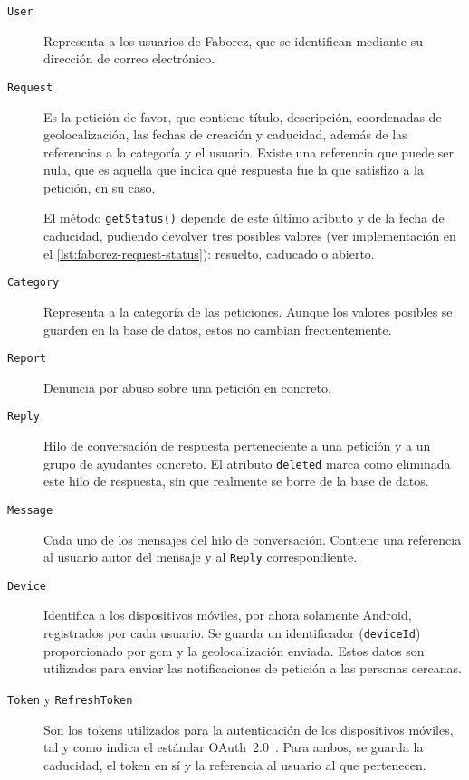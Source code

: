 \documentclass[main]{subfiles}
\begin{document}
\begin{description}
  \item[\texttt{User}] Representa a los usuarios de Faborez, que se identifican mediante su dirección de correo electrónico.
  \item[\texttt{Request}] Es la petición de favor, que contiene título, descripción, coordenadas de geolocalización, las fechas de creación y caducidad, además de las referencias a la categoría y el usuario. Existe una referencia que puede ser nula, que es aquella que indica qué respuesta fue la que satisfizo a la petición, en su caso.
  
  El método \texttt{getStatus()} depende de este último aributo y de la fecha de caducidad, pudiendo devolver tres posibles valores (ver implementación en el \cref{lst:faborez-request-status}): resuelto, caducado o abierto.
  
  \item[\texttt{Category}] Representa a la categoría de las peticiones. Aunque los valores posibles se guarden en la base de datos, estos no cambian frecuentemente.
  
  \item[\texttt{Report}] Denuncia por abuso sobre una petición en concreto.
  
  \item[\texttt{Reply}] Hilo de conversación de respuesta perteneciente a una petición y a un grupo de ayudantes concreto. El atributo \texttt{deleted} marca como eliminada este hilo de respuesta, sin que realmente se borre de la base de datos.
  
  \item[\texttt{Message}] Cada uno de los mensajes del hilo de conversación. Contiene una referencia al usuario autor del mensaje y al \texttt{Reply} correspondiente.
  
  \item[\texttt{Device}] Identifica a los dispositivos móviles, por ahora solamente Android, registrados por cada usuario. Se guarda un identificador (\texttt{deviceId}) proporcionado por \gls{gcm} y la geolocalización enviada. Estos datos son utilizados para enviar las notificaciones de petición a las personas cercanas.
  
  \item[\texttt{Token} y \texttt{RefreshToken}] Son los \glspl{token} utilizados para la autenticación de los dispositivos móviles, tal y como indica el estándar OAuth~2.0~\autocite{oauthrfc}. Para ambos, se guarda la caducidad, el \gls{token} en sí y la referencia al usuario al que pertenecen.
\end{description}
\end{document}
